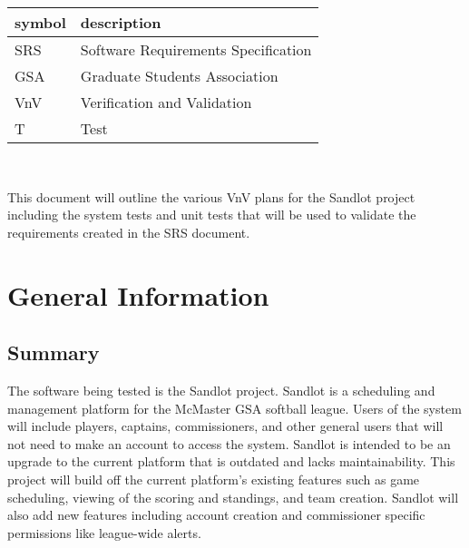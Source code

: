\documentclass[12pt, titlepage]{article}
\begin{document}
\renewcommand{\arraystretch}{1.2}
\begin{tabular}{l l} 
  \toprule		
  \textbf{symbol} & \textbf{description}\\
  \midrule 
  SRS & Software Requirements Specification\\
  GSA & Graduate Students Association\\
  VnV & Verification and Validation\\
  T & Test\\
  \bottomrule
\end{tabular}\\



\newpage


This document will outline the various VnV plans for the Sandlot project including
the system tests and unit tests that will be used to validate the requirements
created in the SRS document.


\section{General Information}

\subsection{Summary}


The software being tested is the Sandlot project. Sandlot is a scheduling and
management platform for the McMaster GSA softball league. Users of the system
will include players, captains, commissioners, and other general users that will
not need to make an account to access the system. Sandlot is intended to be an
upgrade to the current platform that is outdated and lacks maintainability. This
project will build off the current platform's existing features such as game
scheduling, viewing of the scoring and standings, and team creation. Sandlot will
also add new features including account creation and commissioner specific
permissions like league-wide alerts.
\end{document}
